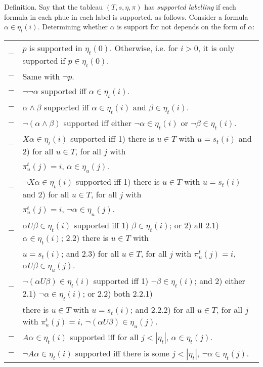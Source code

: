 \documentclass[submission,copyright,creativecommons]{eptcs}
\newenvironment{definition}{Definition. }{}
\begin{document}
\begin{definition}
Say that the tableau $(T,s,\eta,\pi)$
has {\em supported labelling}
if each formula in each phue in each label
is supported, as follows.
Consider a formula $\alpha \in \eta_t(i)$.
Determining whether $\alpha$ is support for not depends on the form
of $\alpha$:

\begin{tabular}{ll}
$-$ &
$p$ is supported in $\eta_t(0)$.
Otherwise, i.e. for $i>0$, it is only supported if $p \in \eta_t(0)$.\\
$-$ &
Same with $\neg p$.\\
$-$ &
$\neg \neg \alpha$ supported iff
$\alpha \in \eta_t(i)$.\\
$-$ &
$\alpha \wedge \beta$ supported iff
$\alpha \in \eta_t(i)$ and
$\beta \in \eta_t(i)$.\\
$-$ &
$\neg ( \alpha \wedge \beta )$ supported iff either
$\neg \alpha \in \eta_t(i)$ or
$\neg \beta \in \eta_t(i)$.\\
$-$ &
$X \alpha \in \eta_t(i)$ supported iff
1) there is $u \in T$ with $u=s_t(i)$
and
2)
for all $u \in T$, for all $j$ with\\& $\pi^t_u(j)=i$,
$\alpha \in \eta_u(j)$.\\
$-$ &
$\neg X \alpha \in \eta_t(i)$ supported iff
1) there is $u \in T$ with $u=s_t(i)$ and
2)
for all $u \in T$, for all $j$ with\\&
 $\pi^t_u(j)=i$,
$\neg \alpha \in \eta_u(j)$.\\
$-$ &
$\alpha U \beta \in \eta_t(i)$ supported iff
1) $\beta \in \eta_t(i)$; or
2) all 
2.1) $\alpha \in \eta_t(i)$;
2.2) there is $u \in T$ with\\& $u=s_t(i)$; and
 2.3)
for all $u \in T$, for all $j$ with $\pi^t_u(j)=i$,
$\alpha U \beta \in \eta_u(j)$.\\
$-$ &
$\neg (\alpha U \beta) \in \eta_t(i)$ supported iff
1) $\neg \beta \in \eta_t(i)$;
and 2) either
2.1) $\neg \alpha \in \eta_t(i)$; or
2.2) both 2.2.1)\\ & there is $u \in T$ with $u=s_t(i)$; and
2.2.2) for all $u \in T$, for all $j$ with $\pi^t_u(j)=i$,
$\neg( \alpha U \beta) \in \eta_u(j)$.\\
$-$ &
$A \alpha  \in \eta_t(i)$ supported iff
for all $j < |\eta_t|$,
$\alpha \in \eta_t(j)$.\\
$-$ &
$\neg A \alpha \in \eta_t(i)$ supported iff
there is some $j < |\eta_t|$,
$\neg \alpha \in \eta_t(j)$.\\
\end{tabular}

\end{definition}
\end{document}
